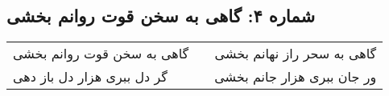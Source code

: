 \begin{center}
\section*{شماره ۴: گاهی به سخن قوت روانم بخشی}
\label{sec:004}
\begin{longtable}{l p{0.5cm} r}
گاهی به سخن قوت روانم بخشی
&&
گاهی به سحر راز نهانم بخشی
\\
گر دل ببری هزار دل باز دهی
&&
ور جان ببری هزار جانم بخشی
\\
\end{longtable}
\end{center}
